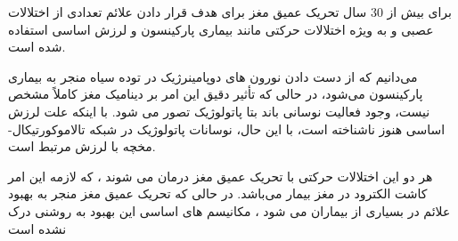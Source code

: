 %
برای بیش از 30 سال تحریک عمیق مغز برای هدف قرار دادن علائم تعدادی از اختلالات عصبی و به ویژه اختلالات حرکتی مانند بیماری پارکینسون و لرزش اساسی  استفاده شده است.

می‌دانیم که از دست دادن نورون های دوپامینرژیک در توده سیاه
 منجر به بیماری پارکینسون می‌شود، در حالی که تأثیر دقیق این امر بر دینامیک مغز کاملاً مشخص نیست، وجود فعالیت نوسانی باند بتا پاتولوژیک تصور می شود.    
با اینکه علت  لرزش اساسی هنوز ناشناخته است، با این حال، نوسانات پاتولوژیک در شبکه تالاموکورتیکال-مخچه با لرزش مرتبط است.

هر دو این اختلالات حرکتی با تحریک عمیق مغز درمان می شوند ، که لازمه این امر کاشت الکترود در مغز بیمار می‌باشد. در حالی که تحریک عمیق مغز منجر به بهبود علائم در بسیاری از بیماران می شود ، مکانیسم های اساسی این بهبود به روشنی درک نشده است
